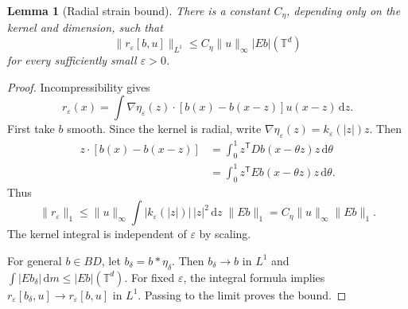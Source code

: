 \documentclass[review,12pt,times,a4paper,nopreprintline]{elsarticle}
\theoremstyle{plain}
\newtheorem{lemma}[theorem]{Lemma}
\theoremstyle{definition}
\theoremstyle{remark}
\newcommand{\T}{\mathbb T}
\newcommand{\dd}{\,\mathrm d}
\numberwithin{equation}{section}
\begin{document}
\begin{lemma}[Radial strain bound]\label{lem:BDcommutator}
There is a constant $C_\eta$, depending only on the kernel and dimension, such that
\begin{equation}\label{eq:BDcommutator}
 \|r_\varepsilon[b,u]\|_{L^1}
 \leq C_\eta\|u\|_\infty |Eb|(\T^d)
\end{equation}
for every sufficiently small $\varepsilon>0$.
\end{lemma}
\begin{proof}
Incompressibility gives
\[
 r_\varepsilon(x)=\int\nabla\eta_\varepsilon(z)\cdot
 [b(x)-b(x-z)]u(x-z)\dd z.
\]
First take $b$ smooth. Since the kernel is radial, write $\nabla\eta_\varepsilon(z)=k_\varepsilon(|z|)z$. Then
\begin{align*}
 z\cdot[b(x)-b(x-z)]
 &=\int_0^1z^{\mathsf T}Db(x-\theta z)z\dd\theta\\
 &=\int_0^1z^{\mathsf T}Eb(x-\theta z)z\dd\theta.
\end{align*}
Thus
\[
 \|r_\varepsilon\|_1
 \leq\|u\|_\infty\int|k_\varepsilon(|z|)|\,|z|^2\dd z\;\|Eb\|_1
 =C_\eta\|u\|_\infty\|Eb\|_1.
\]
The kernel integral is independent of $\varepsilon$ by scaling.

For general $b\in BD$, let $b_\delta=b*\eta_\delta$. Then $b_\delta\to b$ in $L^1$ and $\int|Eb_\delta|\dd m\leq|Eb|(\T^d)$. For fixed $\varepsilon$, the integral formula implies $r_\varepsilon[b_\delta,u]\to r_\varepsilon[b,u]$ in $L^1$. Passing to the limit proves the bound.
\end{proof}
\end{document}
